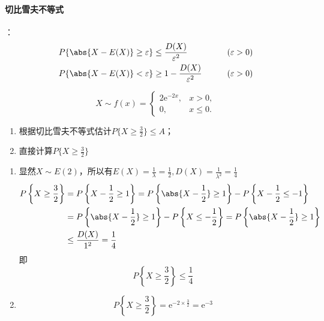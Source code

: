 \paragraph{切比雪夫不等式}：
\begin{align}
    \label{eq:切比雪夫不等式}
    P\{\abs{X-E(X)}\geq \varepsilon\} & \leq \frac{D(X)}{\varepsilon^2} \qquad    & (\varepsilon > 0) \\
    P\{\abs{X-E(X)} < \varepsilon \}  & \geq 1- \frac{D(X)}{\varepsilon^2} \qquad & (\varepsilon > 0)
\end{align}

\begin{example}
    \[
        X\sim f(x) =
        \begin{cases}
            2\mathrm{e}^{-2x}, & x>0,     \\
            0,                 & x\leq 0.
        \end{cases}
    \]
    \begin{enumerate}[(1)]
        \item 根据切比雪夫不等式估计$P\{X\geq\frac{3}{2}\} \leq A$；
        \item 直接计算$P\{X\geq \frac{3}{2}\}$
    \end{enumerate}
\end{example}
\begin{solution}
    \begin{enumerate}[(1)]
        \item 显然$X\sim E(2)$，所以有$E(X) = \frac{1}{\lambda} = \frac{1}{2}, D(X)=\frac{1}{\lambda^2}=\frac{1}{4}$
              \begin{align*}
                  P\left\{X\geq \frac{3}{2}\right\} & = P\left\{ X - \frac{1}{2} \geq 1 \right\} = P\left\{ \abs{X-\frac{1}{2}} \geq 1 \right\} - P\left\{X-\frac{1}{2} \leq -1\right\}   \\
                                                    & =P\left\{ \abs{X-\frac{1}{2}} \geq 1 \right\} - P\left\{ X\leq -\frac{1}{2} \right\} = P\left\{ \abs{X-\frac{1}{2}} \geq 1 \right\} \\
                                                    & \leq \frac{D(X)}{1^2} = \frac{1}{4}
              \end{align*}
              即
              \[ P\left\{X\geq \frac{3}{2}\right\} \leq \frac{1}{4} \]
        \item \[ P\left\{ X\geq \frac{3}{2} \right\} = \mathrm{e}^{-2\times \frac{3}{2}} = \mathrm{e}^{-3} \]
    \end{enumerate}
\end{solution}

